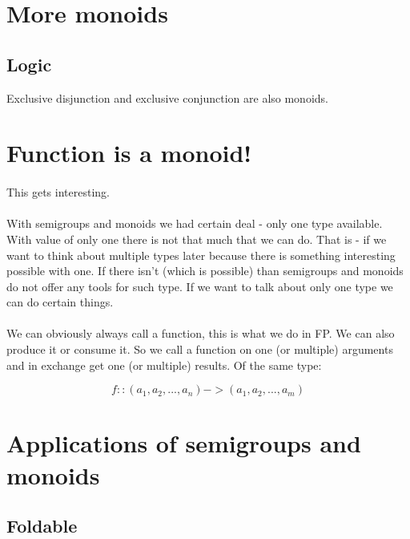\documentclass{article}
\begin{document}
    \section{More monoids}

    \subsection{Logic}

    Exclusive disjunction and exclusive conjunction are also monoids.

    \newpage

    \section{Function is a monoid!}

    \paragraph{}
    This gets interesting. 
    \paragraph{}
    With semigroups and monoids we had certain deal - only one type available. With value of only one there is not that much that we can do. That is - if we want to think about multiple types later because there is something interesting possible with one. If there isn't (which is possible) than semigroups and monoids do not offer any tools for such type. If we want to talk about only one type we can do certain things.
    \paragraph{}
    We can obviously always call a function, this is what we do in FP. We can also produce it or consume it. So we call a function on one (or multiple) arguments and in exchange get one (or multiple) results. Of the same type:

    \begin{equation}
        f :: (a_1, a_2, ..., a_n) -> (a_1, a_2, ..., a_m)
    \end{equation}

    \section{Applications of semigroups and monoids}

    \subsection{Foldable}
\end{document}
